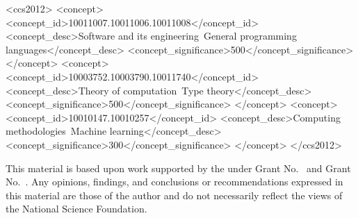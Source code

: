 \documentclass[acmlarge,review,anonymous]{acmart}\settopmatter{printfolios=true}
\begin{document}
\begin{CCSXML}
<ccs2012>
<concept>
<concept_id>10011007.10011006.10011008</concept_id>
<concept_desc>Software and its engineering~General programming languages</concept_desc>
<concept_significance>500</concept_significance>
</concept>
<concept>
<concept_id>10003752.10003790.10011740</concept_id>
<concept_desc>Theory of computation~Type theory</concept_desc>
<concept_significance>500</concept_significance>
</concept>
<concept>
<concept_id>10010147.10010257</concept_id>
<concept_desc>Computing methodologies~Machine learning</concept_desc>
<concept_significance>300</concept_significance>
</concept>
</ccs2012>
\end{CCSXML}





\maketitle










\begin{acks}                            %
  This material is based upon work supported by the
   under Grant
  No.~ and Grant
  No.~.  Any opinions, findings, and
  conclusions or recommendations expressed in this material are those
  of the author and do not necessarily reflect the views of the
  National Science Foundation.
\end{acks}






\end{document}
